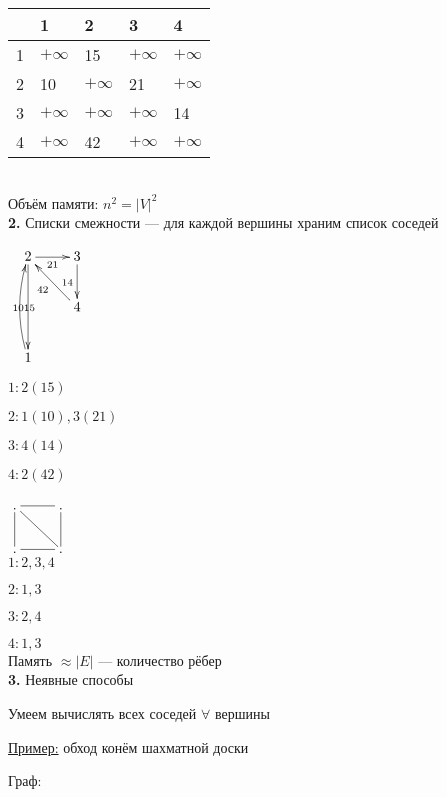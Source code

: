 \documentclass[a4paper, 12pt] {article}
\begin{document}
\begin{tabular}{ | l | l | l |  l | l | }
	\hline
	& 1 & 2 & 3  & 4 \\ \hline
	1 & $ + \infty $ & 15 & $ + \infty $ & $ + \infty $ \\ \hline
	2 & 10 & $ + \infty $ & 21 & $ + \infty $ \\ \hline
	3 & $ + \infty $ & $ + \infty $ & $ + \infty $ & 14 \\ \hline
	4 & $ + \infty $ & 42 & $ + \infty $ & $ + \infty $ \\
	\hline
\end{tabular}\\

Объём памяти: $ n^{2} = |V|^{2} $\\

\textbf{2.} Списки смежности --- для каждой вершины храним список соседей

$ \begin{matrix}
	\xymatrix{
		2 \ar@{->}[dd]_{10} \ar@{->}[r]_{21} \ar@{<-}[rd]_{42} & 3 \ar@{->}[d]_{14}  \\
		& 4 \\
		1 \ar@/^/[uu]_{15} \\
	}
\end{matrix} $ 

$ 1: 2(15) $

$ 2: 1(10), 3(21) $

$ 3: 4(14) $

$ 4: 2(42) $

$ \begin{matrix}
	\xymatrix{
		. \ar@{-}[r] \ar@{-}[rd] \ar@{-}[d] & .  \ar@{-}[d]  \\
		. \ar@{-}[r]   & .   \\
	}
\end{matrix} $\\

$ 1:2,3,4 $

$ 2:1,3 $

$ 3:2,4 $

$ 4:1,3 $\\

Память $ \approx |E| $ --- количество рёбер\\

\textbf{3.} Неявные способы

Умеем вычислять всех соседей $ \forall $ вершины

\underline{Пример:} обход конём шахматной доски

Граф:
\end{document}
